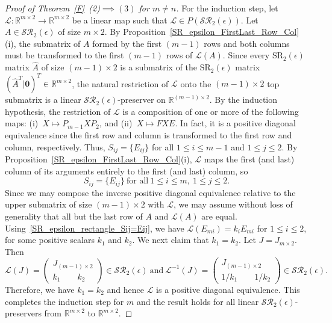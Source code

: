 \documentclass[11pt,reqno]{amsart}
\theoremstyle{plain}
\theoremstyle{definition}
\numberwithin{equation}{section}
\begin{document}
\begin{proof}[Proof of Theorem~\ref{F}~(2)$\implies(3)$ for $m\neq n$]
	For the induction step, let $\mathcal{L}:\mathbb{R}^{m\times2}\to\mathbb{R}^{m\times2}$ be a linear map such that $\mathcal{L}\in P(\mathcal{SR}_2(\epsilon))$. Let $A\in\mathcal{SR}_2(\epsilon)$ of size $m\times2$. By Proposition~\ref{SR_epsilon_FirstLast_Row_Col}(i), the submatrix of $A$ formed by the first $(m-1)$ rows and both columns must be transformed to the first $(m-1)$ rows of $\mathcal{L}(A)$. Since every SR$_2(\epsilon)$ matrix $\widehat{A}$ of size $(m-1)\times 2$ is a submatrix of the SR$_2(\epsilon)$ matrix $(\widehat{A}^T|\mathbf{0})^T\in\mathbb{R}^{m\times 2}$, the natural restriction of $\mathcal{L}$ onto the $(m-1)\times 2$ top submatrix  is a linear $\mathcal{SR}_2(\epsilon)$-preserver on $\mathbb{R}^{(m-1)\times 2}$. By the induction hypothesis, the restriction of $\mathcal{L}$ is a composition of one or more of the following maps: (i)~$X\mapsto P_{m-1}XP_2$, and (ii)~$X\mapsto FXE$. In fact, it is a positive diagonal equivalence since the first row and column is transformed to the first row and column, respectively. Thus, $S_{ij}=\{E_{ij}\}$ for all $1\leq i\leq m-1$ and $1\leq j\leq 2$. By Proposition~\ref{SR_epsilon_FirstLast_Row_Col}(i), $\mathcal{L}$ maps the first (and last) column of its arguments entirely to the first (and last) column, so
	\begin{equation}\label{SR_epsilon_rectangle_Sij=Eij}
		S_{ij}=\{E_{ij}\} ~\text{for all}~ 1\leq i\leq m,~  1\leq j\leq 2.
	\end{equation} 
	Since we may compose the inverse positive diagonal equivalence relative to the upper submatrix of size $(m-1)\times 2$ with $\mathcal{L}$, we may assume without loss of generality that all but the last row of $A$ and $\mathcal{L}(A)$ are equal. Using~\eqref{SR_epsilon_rectangle_Sij=Eij}, we have $\mathcal{L}(E_{mi})=k_iE_{mi}$ for $1\leq i\leq 2$, for some positive scalars $k_1$ and $k_2$. We next claim that $k_1=k_{2}.$ Let $J=J_{m\times2}$. Then
	\[\mathcal{L}(J)=\begin{pmatrix}
		J_{(m-1) \times 2}\\ k_1 \qquad k_2
	\end{pmatrix} \in \mathcal{SR}_2(\epsilon)
	~\text{and} ~
	\mathcal{L}^{-1}(J)= \begin{pmatrix}
		J_{(m-1) \times 2}\\ 1/k_1 \qquad
		1/k_2
	\end{pmatrix}\in \mathcal{SR}_2(\epsilon). \]
	Therefore, we have $k_1=k_{2}$ and hence $\mathcal{L}$ is a positive diagonal equivalence. This completes the induction step for $m$ and the result holds for all linear $\mathcal{SR}_2(\epsilon)$-preservers from $\mathbb{R}^{m\times2}$ to $\mathbb{R}^{m\times2}$. 
	

\end{proof}
\end{document}
